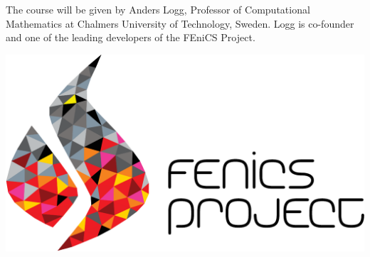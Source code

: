 \documentclass[10pt]{article}
\begin{document}
\noindent
\begin{minipage}{0.6\textwidth}
  The course will be given by Anders Logg, Professor of Computational
  Mathematics at Chalmers University of Technology, Sweden. Logg is
  co-founder and one of the leading developers of the FEniCS Project.

\end{minipage}
\hspace{0.5cm}
\begin{minipage}{0.35\textwidth}
  \includegraphics[width=\textwidth]{pdf/fenics_logo_text.pdf}
\end{minipage}
\vspace{0.5cm}

\end{document}
